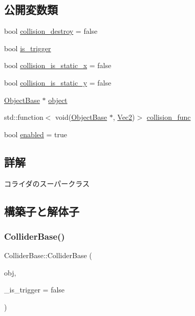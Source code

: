 \subsection*{公開変数類}
\begin{DoxyCompactItemize}
\item 
bool \mbox{\hyperlink{class_collider_base_a1943a8429f6ef2cce5785975cba321b1}{collision\+\_\+destroy}} = false
\item 
bool \mbox{\hyperlink{class_collider_base_a8e2383d9422880103aa5309a6dfcef48}{is\+\_\+trigger}}
\item 
bool \mbox{\hyperlink{class_collider_base_a7e6348c051a8c01ff7884d366bd292eb}{collision\+\_\+is\+\_\+static\+\_\+x}} = false
\item 
bool \mbox{\hyperlink{class_collider_base_a5a50a0f911a108eba730de1b22c1cc9e}{collision\+\_\+is\+\_\+static\+\_\+y}} = false
\item 
\mbox{\hyperlink{class_object_base}{Object\+Base}} $\ast$ \mbox{\hyperlink{class_collider_base_a63adac6a75877857abe9ff2cf4274157}{object}}
\item 
std\+::function$<$ void(\mbox{\hyperlink{class_object_base}{Object\+Base}} $\ast$, \mbox{\hyperlink{common_8h_ae148fff5818e9444b4ab2288829559bf}{Vec2}})$>$ \mbox{\hyperlink{class_collider_base_a0eb190e7e4c44fcb0597dfd4658fdbe2}{collision\+\_\+func}}
\item 
bool \mbox{\hyperlink{class_collider_base_a812053f247dc6357357bdf9353dded77}{enabled}} = true
\end{DoxyCompactItemize}


\subsection{詳解}
コライダのスーパークラス 

\subsection{構築子と解体子}
\mbox{\label{class_collider_base_a61d7057a7e05549088f2b15c1e525858}} 
\subsubsection{\texorpdfstring{Collider\+Base()}{ColliderBase()}}
{\footnotesize\ttfamily Collider\+Base\+::\+Collider\+Base (\begin{DoxyParamCaption}\item[{\mbox{\hyperlink{class_object_base}{Object\+Base}} $\ast$}]{obj,  }\item[{bool}]{\+\_\+is\+\_\+trigger = {\ttfamily false} }\end{DoxyParamCaption})\hspace{0.3cm}{\ttfamily [inline]}}



